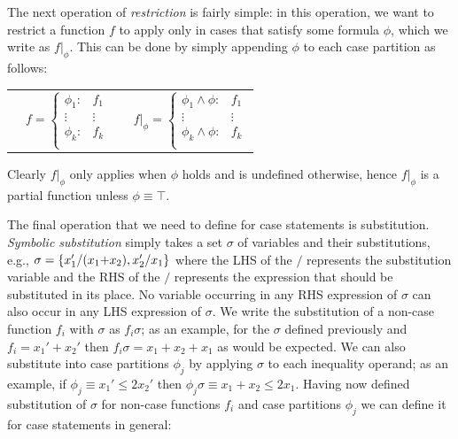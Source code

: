 \documentclass[letterpaper]{article}
\begin{document}
The next operation of \emph{restriction} is fairly simple: in this
operation, we want to restrict a function $f$ to apply only in cases
that satisfy some formula $\phi$, which we write as $f|_{\phi}$.  
This can be done by simply appending $\phi$ to each case partition
as follows:
{\footnotesize
\begin{center}
\begin{tabular}{r c c l}
&
\hspace{-6mm} 
  $f = \begin{cases}
    \phi_1: & f_1 \\ 
   \vdots&\vdots\\ 
    \phi_k: & f_k \\ 
  \end{cases}$
&

&
\hspace{-2mm}
  $f|_{\phi} = \begin{cases}
    \phi_1 \land \phi : & f_1 \\ 
   \vdots&\vdots\\ 
    \phi_k \land \phi : & f_k \\ 
  \end{cases}$
\end{tabular}
\end{center}
}
Clearly $f|_{\phi}$ only applies when $\phi$ holds and is
undefined otherwise, hence $f|_{\phi}$ is a partial function
unless $\phi \equiv \top$.

The final operation that we need to define for case statements is
substitution.  \emph{Symbolic substitution} simply takes a set
$\sigma$ of variables and their substitutions, e.g., $\sigma = \{ x_1'
/ (x_1 \hspace{-.8mm} + \hspace{-.8mm} x_2), x_2' / x_1 \}$ where the
LHS of the $/$ represents the substitution variable and the RHS of the
$/$ represents the expression that should be substituted in its place.
No variable occurring in any RHS expression of $\sigma$ can also occur
in any LHS expression of $\sigma$.  We write the substitution of a
non-case function $f_i$ with $\sigma$ as $f_i\sigma$; as an example,
for the $\sigma$ defined previously and $f_i = x_1' + x_2'$ then
$f_i\sigma = x_1 + x_2 + x_1$ as would be expected.  We can also
substitute into case partitions $\phi_j$ by applying $\sigma$ to each
inequality operand; as an example, if $\phi_j \equiv x_1' \leq 2x_2'$ 
then $\phi_j \sigma \equiv x_1 + x_2 \leq 2x_1$.  
Having now defined substitution of $\sigma$ for non-case
functions $f_i$ and case partitions $\phi_j$ we can define it for case
statements in general:
\end{document}
